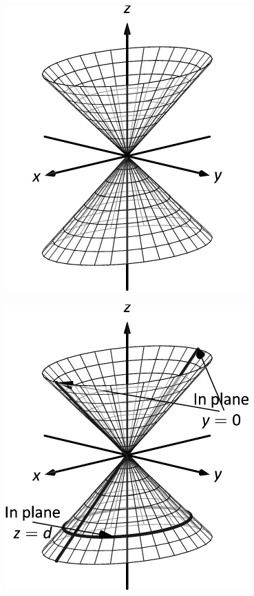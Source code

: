 \documentclass[10pt]{article}
\begin{document}
\includegraphics{figquadric_cone_3DBW.pdf}
\texttt{}

\includegraphics{figquadric_coneb_3DBW.pdf}
\texttt{}
\end{document}
